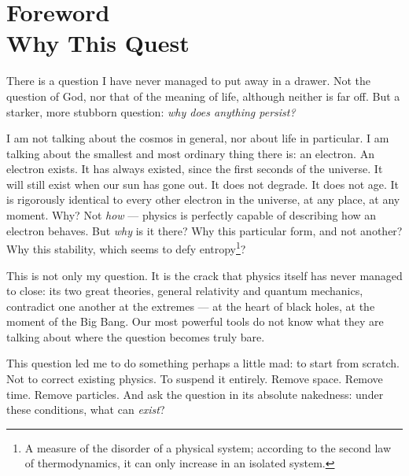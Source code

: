 \documentclass[12pt, a4paper, openright]{book}
\begin{document}
\frontmatter
\tableofcontents
\newpage

\mainmatter

\chapter*{Foreword \\ Why This Quest}

There is a question I have never managed to put away in a drawer. Not the question of God, nor that of the meaning of life, although neither is far off. But a starker, more stubborn question: \emph{why does anything persist?}

\medskip

I am not talking about the cosmos in general, nor about life in particular. I am talking about the smallest and most ordinary thing there is: an electron. An electron exists. It has always existed, since the first seconds of the universe. It will still exist when our sun has gone out. It does not degrade. It does not age. It is rigorously identical to every other electron in the universe, at any place, at any moment. Why? Not \emph{how} --- physics is perfectly capable of describing how an electron behaves. But \emph{why} is it there? Why this particular form, and not another? Why this stability, which seems to defy entropy\footnote{A measure of the disorder of a physical system; according to the second law of thermodynamics, it can only increase in an isolated system.}?

\medskip

This is not only my question. It is the crack that physics itself has never managed to close: its two great theories, general relativity and quantum mechanics, contradict one another at the extremes --- at the heart of black holes, at the moment of the Big Bang. Our most powerful tools do not know what they are talking about where the question becomes truly bare.

\medskip

This question led me to do something perhaps a little mad: to start from scratch. Not to correct existing physics. To suspend it entirely. Remove space. Remove time. Remove particles. And ask the question in its absolute nakedness: under these conditions, what can \emph{exist}?

\medskip
\end{document}
